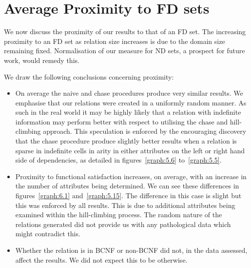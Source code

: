 \section{Average Proximity to FD sets}

We now discuss the proximity of our results to that of an FD set. The
increasing proximity to an FD set as relation size increases is due to
the domain size remaining fixed. Normalisation of our measure for ND
sets, a prospect for future work, would remedy this.

\medskip

We draw the following conclusions concerning proximity:
\begin{itemize}
\item On average the naive and chase procedures produce very similar
results. We emphasise that our relations were created in a uniformly
random manner. As such in the real world it may be highly likely that
a relation with indefinite information may perform better with respect
to utilising the chase and hill-climbing approach. This speculation is
enforced by the encouraging discovery that the chase procedure produce
slightly better results when a relation is sparse in indefinite cells
in arity in either attributes on the left or right hand side of
dependencies, as detailed in figures~\ref{graph:5.6}
to~\ref{graph:5.5}. 
\item Proximity to functional satisfaction increases, on average, with
an increase in the number of attributes being determined. We can see
these differences in figures~\ref{graph:6.1} and~\ref{graph:5.15}. The
difference in this case is slight but this was enforced by all
results. This is due to additional attributes being examined within
the hill-climbing process. The random nature of the relations
generated did not provide us with any pathological data
which might contradict this.
\item Whether the relation is in BCNF or non-BCNF did not, in the
data assessed, affect the results. We did not expect this to be otherwise.
\end{itemize}


